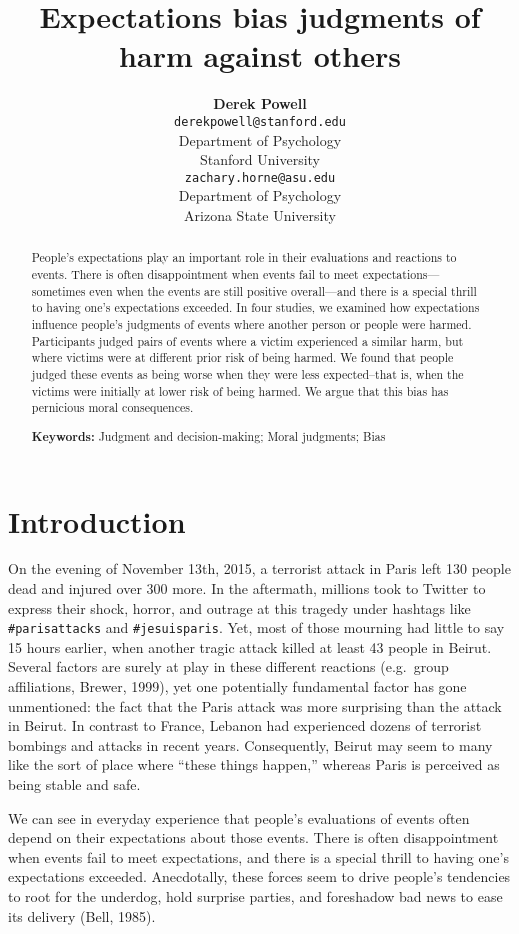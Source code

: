 \documentclass[10pt, letterpaper]{article}
\title{Expectations bias judgments of harm against others}
\author{{\large \bf Derek Powell} \\ \texttt{derekpowell@stanford.edu} \\ Department of Psychology \\ Stanford University \And {\large \bf Zachary Horne} \\ \texttt{zachary.horne@asu.edu} \\ Department of Psychology \\ Arizona State University}
\begin{document}
\maketitle

\begin{abstract}
People's expectations play an important role in their evaluations and
reactions to events. There is often disappointment when events fail to
meet expectations---sometimes even when the events are still positive
overall---and there is a special thrill to having one's expectations
exceeded. In four studies, we examined how expectations influence
people's judgments of events where another person or people were harmed.
Participants judged pairs of events where a victim experienced a similar
harm, but where victims were at different prior risk of being harmed. We
found that people judged these events as being worse when they were less
expected--that is, when the victims were initially at lower risk of
being harmed. We argue that this bias has pernicious moral consequences.

\textbf{Keywords:}
Judgment and decision-making; Moral judgments; Bias
\end{abstract}

\section{Introduction}\label{introduction}

On the evening of November 13th, 2015, a terrorist attack in Paris left
130 people dead and injured over 300 more. In the aftermath, millions
took to Twitter to express their shock, horror, and outrage at this
tragedy under hashtags like \texttt{\#parisattacks} and
\texttt{\#jesuisparis}. Yet, most of those mourning had little to say 15
hours earlier, when another tragic attack killed at least 43 people in
Beirut. Several factors are surely at play in these different reactions
(e.g.~group affiliations, Brewer, 1999), yet one potentially fundamental
factor has gone unmentioned: the fact that the Paris attack was more
surprising than the attack in Beirut. In contrast to France, Lebanon had
experienced dozens of terrorist bombings and attacks in recent years.
Consequently, Beirut may seem to many like the sort of place where
``these things happen,'' whereas Paris is perceived as being stable and
safe.

We can see in everyday experience that people's evaluations of events
often depend on their expectations about those events. There is often
disappointment when events fail to meet expectations, and there is a
special thrill to having one's expectations exceeded. Anecdotally, these
forces seem to drive people's tendencies to root for the underdog, hold
surprise parties, and foreshadow bad news to ease its delivery (Bell,
1985).
\end{document}

